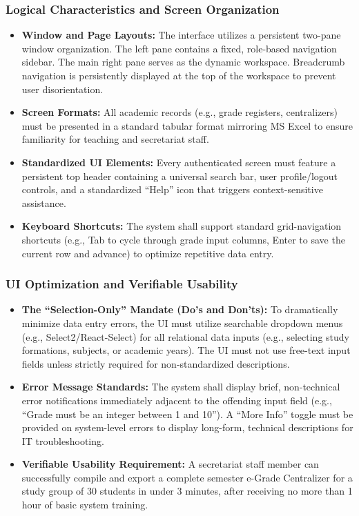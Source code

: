 \documentclass[11pt, a4paper]{article}
\begin{document}
\subsubsection{Logical Characteristics and Screen Organization}
\begin{itemize}
    \item \textbf{Window and Page Layouts:} The interface utilizes a persistent two-pane window organization. The left pane contains a fixed, role-based navigation sidebar. The main right pane serves as the dynamic workspace. Breadcrumb navigation is persistently displayed at the top of the workspace to prevent user disorientation.
    \item \textbf{Screen Formats:} All academic records (e.g., grade registers, centralizers) must be presented in a standard tabular format mirroring MS Excel to ensure familiarity for teaching and secretariat staff.
    \item \textbf{Standardized UI Elements:} Every authenticated screen must feature a persistent top header containing a universal search bar, user profile/logout controls, and a standardized ``Help'' icon that triggers context-sensitive assistance.
    \item \textbf{Keyboard Shortcuts:} The system shall support standard grid-navigation shortcuts (e.g., Tab to cycle through grade input columns, Enter to save the current row and advance) to optimize repetitive data entry.
\end{itemize}

\subsubsection{UI Optimization and Verifiable Usability}
\begin{itemize}
    \item \textbf{The ``Selection-Only'' Mandate (Do's and Don'ts):} To dramatically minimize data entry errors, the UI must utilize searchable dropdown menus (e.g., Select2/React-Select) for all relational data inputs (e.g., selecting study formations, subjects, or academic years). The UI must not use free-text input fields unless strictly required for non-standardized descriptions.
    \item \textbf{Error Message Standards:} The system shall display brief, non-technical error notifications immediately adjacent to the offending input field (e.g., ``Grade must be an integer between 1 and 10''). A ``More Info'' toggle must be provided on system-level errors to display long-form, technical descriptions for IT troubleshooting.
    \item \textbf{Verifiable Usability Requirement:} A secretariat staff member can successfully compile and export a complete semester e-Grade Centralizer for a study group of 30 students in under 3 minutes, after receiving no more than 1 hour of basic system training.
\end{itemize}
\end{document}
